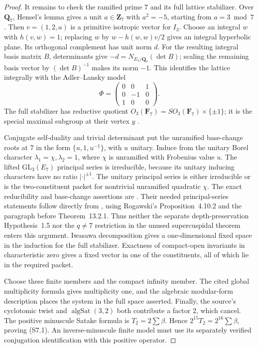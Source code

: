 \documentclass[11pt,a4paper]{article}
\theoremstyle{definition}
\begin{document}
\begin{proof}
It remains to check the ramified prime \(7\) and its full lattice
stabilizer. Over \(\mathbf Q_7\), Hensel's lemma gives a unit
\(a\in\mathbf Z_7\) with \(a^2=-5\), starting from \(a=3\bmod7\).
Then \(v=(1,2,a)\) is a primitive isotropic vector for \(I_3\).
Choose an integral \(w\) with \(h(v,w)=1\); replacing \(w\) by
\(w-h(w,w)v/2\) gives an integral hyperbolic plane. Its orthogonal
complement has unit norm \(d\). For the resulting integral basis
matrix \(B\), determinants give
\(-d=N_{E_7/\mathbf Q_7}(\det B)\); scaling the remaining basis
vector by \((\det B)^{-1}\) makes its norm \(-1\). This identifies
the lattice integrally with the Adler--Lansky model
\[
 \Phi=\begin{pmatrix}0&0&1\\0&-1&0\\1&0&0\end{pmatrix}.
\]
The full stabilizer has reductive quotient
\(O_3(\mathbf F_7)=SO_3(\mathbf F_7)\times\{\pm1\}\);
it is the special maximal subgroup at their vertex \(y\)
\cite[\S4.1--4.2.1, pp.~10--12]{K17AdlerLansky2010}.

Conjugate self-duality and trivial determinant put the unramified
base-change roots at \(7\) in the form \(\{u,1,u^{-1}\}\), with \(u\)
unitary. Induce from the unitary Borel character
\(\lambda_1=\chi,\lambda_2=1\), where \(\chi\) is unramified with
Frobenius value \(u\). The lifted \(\mathrm{GL}_3(E_7)\) principal
series is irreducible, because its unitary inducing characters have
no ratio \(|\cdot|^{\pm1}\). The unitary principal series is either
irreducible or is the two-constituent packet for nontrivial
unramified quadratic \(\chi\).
The exact reducibility and base-change assertions are
\cite[\S4.4, pp.~14--15; Proposition~6.1(1),(4), p.~21;
Proposition~7.1(i),(iv), p.~28]{K17AdlerLansky2010}.
Their needed principal-series statements follow directly from
\cite[Proposition~5.1 and its complete proof, pp.~19--20,
published numbering Proposition~4.1]{K17AdlerLanskyUnram},
using Rogawski's Proposition~4.10.2 and the paragraph before
Theorem~13.2.1. Thus neither the separate depth-preservation
Hypothesis~1.5 nor the \(q\ne7\) restriction in the unused
supercuspidal theorem enters this argument.
Iwasawa decomposition gives a one-dimensional fixed space in the
induction for the full stabilizer. Exactness of compact-open
invariants in characteristic zero gives a fixed vector in one of
the constituents, all of which lie in the required packet.

Choose these finite members and the compact infinity member.
The cited global multiplicity formula gives multiplicity one, and
the algebraic modular-form description places the system in the
full space asserted. Finally, the source's cyclotomic twist and
\(\operatorname{algSat}(3,2)\) both contribute a factor \(2\), which
cancel. The positive minuscule Satake formula is
\(T_2=2\sum\beta\). Hence \(2^{15}T_2=2^{16}\sum\beta\), proving
(S7.1). An inverse-minuscule finite model must use its separately
verified conjugation identification with this positive operator.
\end{proof}
\end{document}
